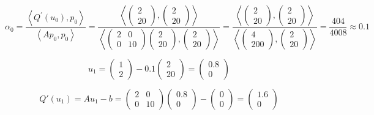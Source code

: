\documentclass[12 pt]{article}
\begin{document}
\begin{equation*}
	\alpha_{0}=\frac{\left\langle Q^{\prime}\left(u_{0}\right), p_{0}\right\rangle}{\left\langle A p_{0}, p_{0}\right\rangle}=\frac{\left\langle\left(\begin{array}{c}
		2 \\
		20
		\end{array}\right),\left(\begin{array}{c}
		2 \\
		20
		\end{array}\right)\right\rangle}{\left\langle\left(\begin{array}{cc}
		2 & 0 \\
		0 & 10
		\end{array}\right)\left(\begin{array}{c}
		2 \\
		20
		\end{array}\right),\left(\begin{array}{c}
		2 \\
		20
		\end{array}\right)\right\rangle}=\frac{\left\langle\left(\begin{array}{c}
		2 \\
		20
		\end{array}\right),\left(\begin{array}{c}
		2 \\
		20
		\end{array}\right)\right\rangle}{\left\langle\left(\begin{array}{c}
		4 \\
		200
		\end{array}\right),\left(\begin{array}{c}
		2 \\
		20
		\end{array}\right)\right\rangle}=\frac{404}{4008} \approx 0.1
\end{equation*}


$$u_1 = \left(\begin{array}{l}
1 \\
2
\end{array}\right) - 0.1 \left(\begin{array}{l}
2 \\
20
\end{array}\right) = \left(\begin{array}{l}
0.8 \\
0
\end{array}\right)$$


$$Q'(u_1) = Au_1-b = \left(\begin{array}{cc}
2 & 0 \\
0 & 10
\end{array}\right)\left(\begin{array}{c}
0.8 \\
0
\end{array}\right) - \left(\begin{array}{c}
0 \\
0
\end{array}\right) = \left(\begin{array}{c}
1.6 \\
0
\end{array}\right)$$
\end{document}
